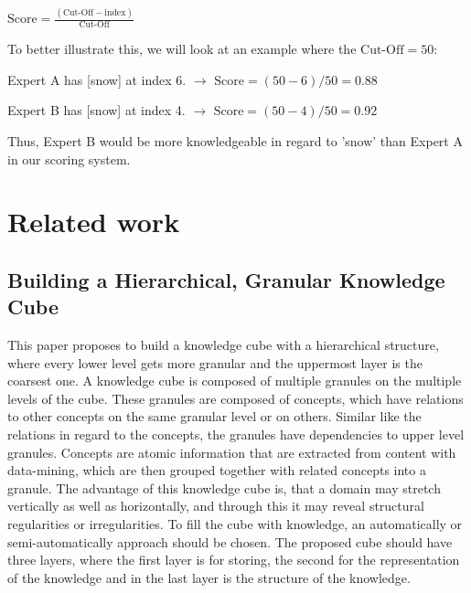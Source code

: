 \documentclass[a4paper,12pt]{article}
\begin{document}
\begin{center}
    $ \text{Score} = \frac{(\text{Cut-Off} - \text{index})}{\text{Cut-Off}}$ 
\end{center}

To better illustrate this, we will look at an example where the $ \text{Cut-Off} = 50 $:
\begin{center}
Expert A has [snow] at index 6.			$\rightarrow$ 	$\text{Score} = (50 - 6) / 50 = 0.88$


Expert B has [snow] at index 4.			$\rightarrow$ 	$\text{Score} = (50 - 4) / 50 = 0.92$

\end{center}

Thus, Expert B would be more knowledgeable in regard to 'snow' than Expert A in our scoring system.

\newpage
\section{Related work}

\subsection{Building a Hierarchical, Granular Knowledge Cube}
This paper \cite{Denzler2015BuildingAH} proposes to build a knowledge cube with a hierarchical structure, where every lower level gets more granular and the uppermost layer is the coarsest one. 
A knowledge cube is composed of multiple granules on the multiple levels of the cube. 
These granules are composed of concepts, which have relations to other concepts on the same granular level or on others.
Similar like the relations in regard to the concepts, the granules have dependencies to upper level granules. Concepts are atomic information that are extracted from content with data-mining, which are then grouped together with related concepts into a granule. 
The advantage of this knowledge cube is, that a domain may stretch vertically as well as horizontally, and through this it may reveal structural regularities or irregularities. 
To fill the cube with knowledge, an automatically or semi-automatically approach should be chosen. 
The proposed cube should have three layers, where the first layer is for storing, the second for the representation of the knowledge and in the last layer is the structure of the knowledge.
\end{document}
